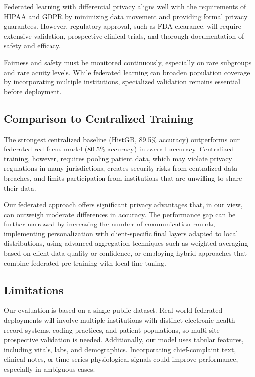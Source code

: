\documentclass[journal,article,submit,pdftex,moreauthors]{Definitions/mdpi}
\begin{document}
Federated learning with differential privacy aligns well with the requirements of HIPAA and GDPR by minimizing data movement and providing formal privacy guarantees. However, regulatory approval, such as FDA clearance, will require extensive validation, prospective clinical trials, and thorough documentation of safety and efficacy.

Fairness and safety must be monitored continuously, especially on rare subgroups and rare acuity levels. While federated learning can broaden population coverage by incorporating multiple institutions, specialized validation remains essential before deployment.

\subsection{Comparison to Centralized Training}

The strongest centralized baseline (HistGB, 89.5\% accuracy) outperforms our federated red-focus model (80.5\% accuracy) in overall accuracy. Centralized training, however, requires pooling patient data, which may violate privacy regulations in many jurisdictions, creates security risks from centralized data breaches, and limits participation from institutions that are unwilling to share their data.

Our federated approach offers significant privacy advantages that, in our view, can outweigh moderate differences in accuracy. The performance gap can be further narrowed by increasing the number of communication rounds, implementing personalization with client-specific final layers adapted to local distributions, using advanced aggregation techniques such as weighted averaging based on client data quality or confidence, or employing hybrid approaches that combine federated pre-training with local fine-tuning.

\subsection{Limitations}

Our evaluation is based on a single public dataset. Real-world federated deployments will involve multiple institutions with distinct electronic health record systems, coding practices, and patient populations, so multi-site prospective validation is needed. Additionally, our model uses tabular features, including vitals, labs, and demographics. Incorporating chief-complaint text, clinical notes, or time-series physiological signals could improve performance, especially in ambiguous cases.
\end{document}
